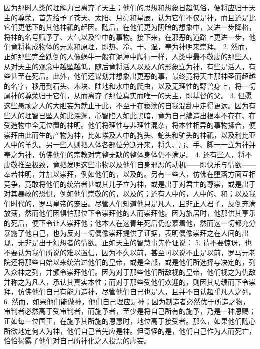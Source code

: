 因为那时人类的理解力已离弃了天主；他们的思想和想象日趋低俗，便将应归于天主的尊荣，首先给予了苍天、太阳、月亮和星辰，认为它们不仅是神，而且还是比它们更低下的其他神祇的起因。随后，在他们更为阴暗的想象中，又进一步降格，将神的名号赋予了、大气以及空中的事物。接下来，在邪恶的道路上更进一步，他们竟将构成物体的元素和原理，即热、冷、干、湿，奉为神明来崇拜。 2. 然而，正如那些完全跌倒的人像蜗牛一般在泥淖中爬行一样，人类中最不敬虔的那些人，从对天主的观念中越坠越低，随后竟将活人以及人的形象立为神，有些是活人，有些甚至在死后。此外，他们还谋划并想象出更恶的事，最终竟将天主那神圣而超越的名字，移用到石头、木块、陆地和水中的爬虫，以及无理性的野兽身上，将一切属神的尊荣归于它们，从而离弃了那位真实而唯一的天主，即基督的父。 3. 但愿这些愚顽之人的大胆妄为就止于此，不至于在亵渎的自我混乱中走得更远。因为有些人的理智已坠入如此深渊，心智陷入如此黑暗，竟为自己编造出根本不存在、在受造物中全无位置的神明。他们将理性与非理性混杂，将本性相异的事物揉合，便崇拜由此而生的产物为神，比如埃及人中的狗头、蛇头和驴头的神祇，以及利比亚人中的羊头。另一些人则把人体各部位分割开来，将头、肩、手、脚一一立为神并奉之为神，仿佛他们的宗教对完整无缺的整体身体仍不满足。 4. 还有些人，将不虔敬推至极致，竟把发明这些事物以及他们自身邪恶的动机——即快乐与情欲——奉若神明，并加以崇拜，例如他们的，以及的。另有一些人，仿佛在堕落方面互相竞争，竟敢将他们的统治者甚或其儿子立为神，或是出于对君主的尊崇，或是出于对其暴政的恐惧，例如他们崇敬的的，以及的；还有人中的，人中的、和；以及我们时代的，罗马皇帝的宠臣。尽管人们知道他只是凡人，且非正人君子，反倒充满放荡，然而他们因惧怕那位下令崇拜他的人而崇拜他。因为旅居时，他那供其享乐的死后，便下令让人崇拜他；他本人在这青年死后仍恋慕着他，然而这一切都充分暴露了他自己，也为反对一切偶像崇拜提供了证据，表明偶像崇拜之在人间的出现，无非是出于幻想者的情欲。正如天主的智慧事先作证说：  5. 请不要惊讶，也不要认为我们所说的难以置信，因为不久以前，甚至可以说不止是以前，罗马元老院还将那些自始以来统治过他们的皇帝，或是全部，或是他们所选择与决定的，列入众神之列，并颁令崇拜他们。因为对于那些他们所敌视的皇帝，他们视之为仇敌并称之为凡人，承认其真实本性；而对于那些受他们欢迎的，则因其功绩而下令崇拜，仿佛他们自己有能力造神，尽管他们自己也是人，且并不自认超乎凡人之列。 6. 然而，如果他们能做神，他们自己理应是神；因为制造者必然优于所造之物，审判者必然高于受审判者，而施予者，至少是将自己所有的施予，乃是一种恩赐；正如每一位国王，在施予其所施的恩惠时，地位高于接受者。那么，如果他们随心所欲地定何人为神，他们自己首先应是神。但奇怪的是，他们自己作为人而死亡，恰恰揭露了他们对自己所神化之人投票的虚妄。\par

